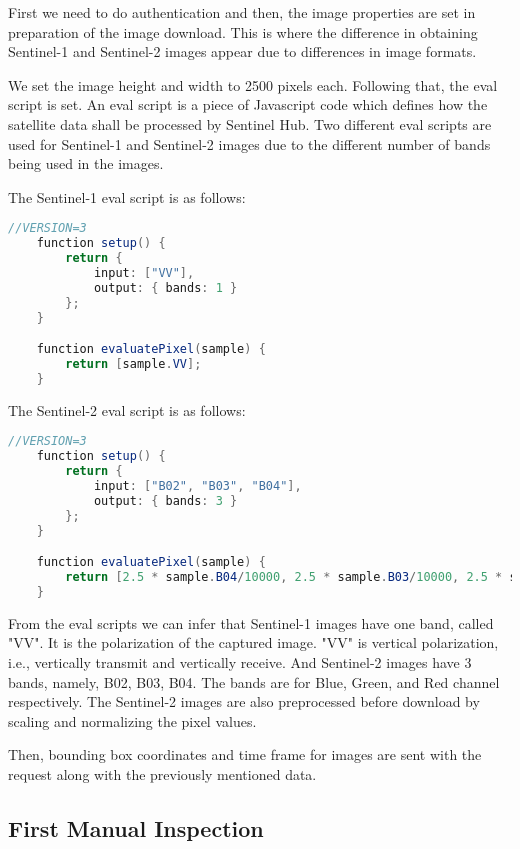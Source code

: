 First we need to do authentication and then, the image properties are set in preparation of the image download. This is where the difference in obtaining Sentinel-1 and Sentinel-2 images appear due to differences in image formats.

We set the image height and width to 2500 pixels each. Following that, the eval script is set. An eval script is a piece of Javascript code which defines how the satellite data shall be processed by Sentinel Hub\cite{evalDoc}. Two different eval scripts are used for Sentinel-1 and Sentinel-2 images due to the different number of bands being used in the images.

The Sentinel-1 eval script is as follows:

\begin{lstlisting}[language=Java]
    //VERSION=3
    function setup() {
        return {
            input: ["VV"],
            output: { bands: 1 }
        };
    }

    function evaluatePixel(sample) {
        return [sample.VV];
    }
\end{lstlisting}

The Sentinel-2 eval script is as follows:

\begin{lstlisting}[language=Java]
    //VERSION=3
    function setup() {
        return {
            input: ["B02", "B03", "B04"],
            output: { bands: 3 }
        };
    }

    function evaluatePixel(sample) {
        return [2.5 * sample.B04/10000, 2.5 * sample.B03/10000, 2.5 * sample.B02/10000];
    }
\end{lstlisting}

From the eval scripts we can infer that Sentinel-1 images have one band, called "VV". It is the polarization of the captured image. "VV" is vertical polarization, i.e.,  vertically transmit and vertically receive. And Sentinel-2 images have 3 bands, namely, B02, B03, B04. The bands are for Blue, Green, and Red channel respectively. The Sentinel-2 images are also preprocessed before download by scaling and normalizing the pixel values. 

Then, bounding box coordinates and time frame for images are sent with the request along with the previously mentioned data.

\subsection{First Manual Inspection}

